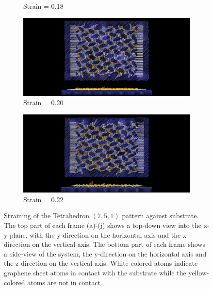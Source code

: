 \begin{figure}[H]
\begin{subfigure}[b]{0.49\textwidth}
        \caption{Strain = 0.18}
    \end{subfigure}
    \begin{subfigure}[b]{0.49\textwidth}
        \centering
        \includegraphics[width=\textwidth]{figures/baseline/contact_vs_stretch/popup/pop_stretch0020.png}
        \caption{Strain = 0.20}
    \end{subfigure}
    \begin{subfigure}[b]{0.49\textwidth}
        \centering
        \includegraphics[width=\textwidth]{figures/baseline/contact_vs_stretch/popup/pop_stretch0022.png}
        \caption{Strain = 0.22}
        \label{fig:tetrahedron_strain_j}
    \end{subfigure}
    \hfill
       \caption{Straining of the Tetrahedron $(7,5,1)$ pattern against substrate. The top part of each frame (a)-(j) shows a top-down view into the x-y plane, with the y-direction on the horizontal axis and the x-direction on the vertical axis. The bottom part of each frame shows a side-view of the system, the y-direction on the horizontal axis and the z-direction on the vertical axis. White-colored atoms indicate graphene sheet atoms in contact with the substrate while the yellow-colored atoms are not in contact.}
       \label{fig:tetrahedron_strain}
  \end{figure}


